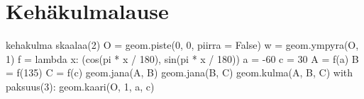 \section*{Kehäkulmalause}

\begin{luoKuva}{kehakulma}
skaalaa(2)
O = geom.piste(0, 0, piirra = False)
w = geom.ympyra(O, 1)
f = lambda x: (cos(pi * x / 180), sin(pi * x / 180))
a = -60
c = 30
A = f(a)
B = f(135)
C = f(c)
geom.jana(A, B)
geom.jana(B, C)
geom.kulma(A, B, C)
with paksuus(3):
	geom.kaari(O, 1, a, c)
\end{luoKuva}
